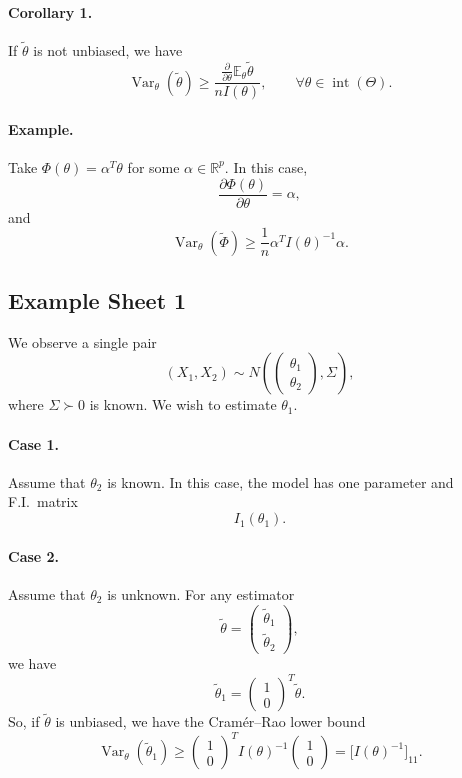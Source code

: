 \documentclass[11pt,a4paper]{article}
\begin{document}
\paragraph{Corollary 1.}
If $\tilde{\theta}$ is not unbiased, we have
\[
\operatorname{Var}_{\theta}(\tilde{\theta})
\geq
\frac{
\displaystyle
\frac{\partial}{\partial\theta}
\mathbb{E}_{\theta}\tilde{\theta}
}{
nI(\theta)
},
\qquad
\forall\theta\in\operatorname{int}(\Theta).
\]

\paragraph{Example.}
Take $\Phi(\theta)=\alpha^{T}\theta$ for some
$\alpha\in\mathbb{R}^p$.
In this case,
\[
\frac{\partial\Phi(\theta)}{\partial\theta}=\alpha,
\]
and
\[
\operatorname{Var}_{\theta}(\tilde{\Phi})
\geq
\frac{1}{n}\alpha^{T}I(\theta)^{-1}\alpha.
\]

\subsection*{Example Sheet 1}

We observe a single pair
\[
(X_1,X_2)
\sim
N\left(
\begin{pmatrix}
\theta_1\\
\theta_2
\end{pmatrix},
\Sigma
\right),
\]
where $\Sigma\succ0$ is known.
We wish to estimate $\theta_1$.

\paragraph{Case 1.}
Assume that $\theta_2$ is known.
In this case, the model has one parameter and F.I.\ matrix
\[
I_1(\theta_1).
\]

\paragraph{Case 2.}
Assume that $\theta_2$ is unknown.
For any estimator
\[
\tilde{\theta}
=
\begin{pmatrix}
\tilde{\theta}_1\\
\tilde{\theta}_2
\end{pmatrix},
\]
we have
\[
\tilde{\theta}_1
=
\begin{pmatrix}
1\\
0
\end{pmatrix}^{T}
\tilde{\theta}.
\]
So, if $\tilde{\theta}$ is unbiased, we have the Cram\'er--Rao lower bound
\[
\operatorname{Var}_{\theta}(\tilde{\theta}_1)
\geq
\begin{pmatrix}
1\\
0
\end{pmatrix}^{T}
I(\theta)^{-1}
\begin{pmatrix}
1\\
0
\end{pmatrix}
=
\bigl[I(\theta)^{-1}\bigr]_{11}.
\]
\end{document}
